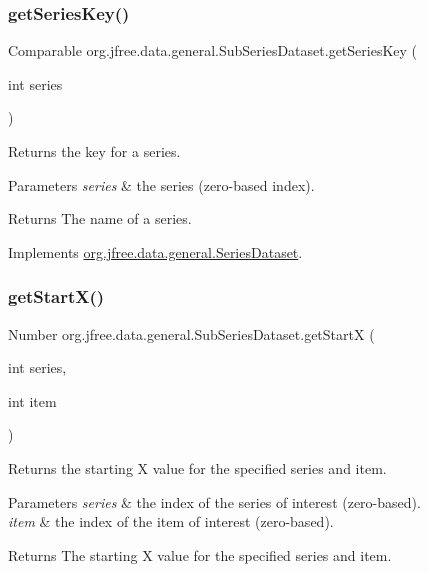 \subsubsection{\texorpdfstring{get\+Series\+Key()}{getSeriesKey()}}
{\footnotesize\ttfamily Comparable org.\+jfree.\+data.\+general.\+Sub\+Series\+Dataset.\+get\+Series\+Key (\begin{DoxyParamCaption}\item[{int}]{series }\end{DoxyParamCaption})}

Returns the key for a series.


\begin{DoxyParams}{Parameters}
{\em series} & the series (zero-\/based index).\\
\hline
\end{DoxyParams}
\begin{DoxyReturn}{Returns}
The name of a series. 
\end{DoxyReturn}


Implements \mbox{\hyperlink{interfaceorg_1_1jfree_1_1data_1_1general_1_1_series_dataset_a60488892b2314a05a012999e26a74178}{org.\+jfree.\+data.\+general.\+Series\+Dataset}}.

\mbox{\label{classorg_1_1jfree_1_1data_1_1general_1_1_sub_series_dataset_a81fe209cb69474ae0af304d45aeec686}} 
\subsubsection{\texorpdfstring{get\+Start\+X()}{getStartX()}}
{\footnotesize\ttfamily Number org.\+jfree.\+data.\+general.\+Sub\+Series\+Dataset.\+get\+StartX (\begin{DoxyParamCaption}\item[{int}]{series,  }\item[{int}]{item }\end{DoxyParamCaption})}

Returns the starting X value for the specified series and item.


\begin{DoxyParams}{Parameters}
{\em series} & the index of the series of interest (zero-\/based). \\
\hline
{\em item} & the index of the item of interest (zero-\/based).\\
\hline
\end{DoxyParams}
\begin{DoxyReturn}{Returns}
The starting X value for the specified series and item. 
\end{DoxyReturn}


